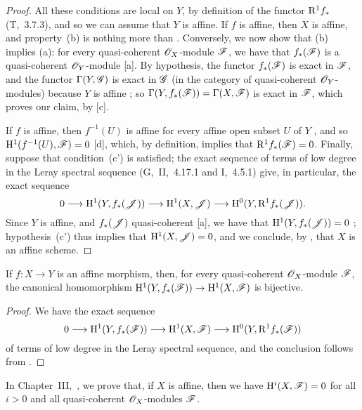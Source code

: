 \begin{proof}
\label{proof-2.5.2.2}
All these conditions are local on $Y$, by definition of the functor $\mathrm{R}^1 f_*$ (T,~3.7.3), and so we can assume that $Y$ is affine.
If $f$ is affine, then $X$ is affine, and property~(b) is nothing more than .
Conversely, we now show that (b) implies (a):
for every quasi-coherent $\mathscr{O}_X$-module $\mathscr{F}$, we have that $f_*(\mathscr{F})$ is a quasi-coherent $\mathscr{O}_Y$-module [a].
By hypothesis, the functor $f_*(\mathscr{F})$ is exact in $\mathscr{F}$, and the functor $\Gamma(Y,\mathscr{G})$ is exact in $\mathscr{G}$ (in the category of quasi-coherent $\mathscr{O}_Y$-modules) because $Y$ is affine ;
so $\Gamma(Y,f_*(\mathscr{F}))=\Gamma(X,\mathscr{F})$ is exact in $\mathscr{F}$, which proves our claim, by [c].

If $f$ is affine, then $f^{-1}(U)$ is affine for every affine open subset $U$ of $Y$ , and so $\mathrm{H}^1(f^{-1}(U),\mathscr{F})=0$ [d], which, by definition, implies that $\mathrm{R}^1 f_*(\mathscr{F})=0$.
Finally, suppose that condition~(c') is satisfied;
the exact sequence of terms of low degree in the Leray spectral sequence (G,~II,~4.17.1 and I,~4.5.1) give, in particular, the exact sequence
\[
    0\to\HH^1(Y,f_*(\sh{J}))\to\HH^1(X,\sh{J})\to\HH^0(Y,\RR^1 f_*(\sh{J})).
\]
Since $Y$ is affine, and $f_*(\mathscr{J})$ quasi-coherent [a], we have that $\mathrm{H}^1(Y,f_*(\mathscr{J}))=0$ ;
hypothesis~(c') thus implies that $\mathrm{H}^1(X,\mathscr{J})=0$, and we conclude, by , that $X$ is an affine scheme.
\end{proof}

\begin{cor}[5.2.3]
\label{2.5.2.3}
If $f:X\to Y$ is an affine morphism, then, for every quasi-coherent $\mathscr{O}_X$-module $\mathscr{F}$, the canonical homomorphism $\HH^1(Y,f_*(\sh{F}))\to\HH^1(X,\sh{F})$ is bijective.
\end{cor}

\begin{proof}
\label{proof-2.5.2.3}
We have the exact sequence
\[
  0\to\HH^1(Y,f_*(\sh{F}))\to\HH^1(X,\sh{F})\to\HH^0(Y,\RR^1 f_*(\sh{F}))
\]
of terms of low degree in the Leray spectral sequence, and the conclusion follows from .
\end{proof}

\begin{rmk}[5.2.4]
\label{2.5.2.4}
In Chapter~III,~, we prove that, if $X$ is affine, then we have $\mathrm{H}^i(X,\mathscr{F})=0$ for all $i>0$ and all quasi-coherent $\mathscr{O}_X$-modules $\mathscr{F}$.
\end{rmk}

